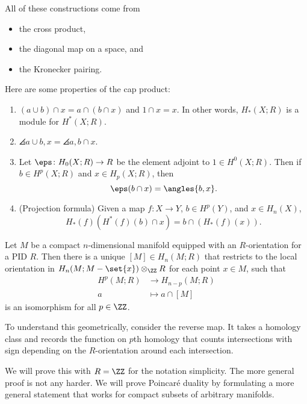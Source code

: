 \documentclass{standalone}
\begin{document}
\begin{note}
  All of these constructions come from
  \begin{itemize}[nosep]
    \item the cross product,
    \item the diagonal map on a space, and
    \item the Kronecker pairing.
  \end{itemize}
\end{note}
Here are some properties of the cap product:
\begin{enumerate}
  \item \((a \cup b) \cap x = a \cap (b \cap x)\) and \(1 \cap x = x\).
    In other words, \(H_*(X; R)\) is a module for \(H^*(X; R)\).
  \item \(\angles{a \cup b, x} = \angles{a, b \cap x}\).
  \item Let \(\eps \colon H_0(X; R) \to R\) be
    the element adjoint to \(1 \in H^0(X; R)\).
    Then if \(b \in H^p(X; R)\) and \(x \in H_p(X; R)\), then
    \[
      \eps(b \cap x) = \angles{b, x}.
    \]
  \item(Projection formula) Given a map \(f \colon X \to Y\),
                                        \(b \in H^p(Y)\), and
                                        \(x \in H_n(X)\),
    \[
      H_*(f)(H^*(f)(b) \cap x) = b \cap (H_*(f)(x)).
    \]
\end{enumerate}

\begin{theorem}
  Let \(M\) be a compact \(n\)-dimensional manifold
  equipped with an \(R\)-orientation for a PID \(R\).
  Then there is a unique \([M] \in H_n(M; R)\) that
  restricts to the local orientation in \(H_n(M; M - \set{x}) \otimes_\ZZ R\)
  for each point \(x \in M\), such that
  \begin{align*}
    H^p(M; R) &\to H_{n-p}(M; R) \\[-1ex]
      a &\mapsto a \cap [M]
  \end{align*}
  is an isomorphism for all \(p \in \ZZ\).
\end{theorem}
To understand this geometrically, consider the reverse map.
It takes a homology class and records the function on \(p\)th homology
that counts intersections with sign depending on the \(R\)-orientation
around each intersection.

We will prove this with \(R = \ZZ\) for the notation simplicity.
The more general proof is not any harder.
We will prove Poincar\'e duality by formulating
a more general statement that works for
compact subsets of arbitrary manifolds.
\end{document}
